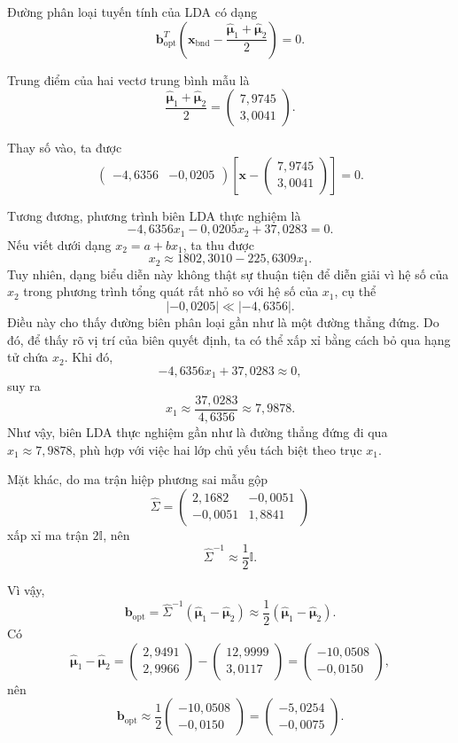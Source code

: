 Đường phân loại tuyến tính của LDA có dạng
\[
\bm{b}_{\text{opt}}^T
\left(
\bm{x}_{\text{bnd}}
-
\frac{\hat{\bm{\mu}}_1+\hat{\bm{\mu}}_2}{2}
\right)
=0.
\]

Trung điểm của hai vectơ trung bình mẫu là
\[
\frac{\hat{\bm{\mu}}_1+\hat{\bm{\mu}}_2}{2}
=
\begin{pmatrix}
	7{,}9745\\
	3{,}0041
\end{pmatrix}.
\]

Thay số vào, ta được
\[
\begin{pmatrix}
	-4{,}6356 & -0{,}0205
\end{pmatrix}
\left[
\bm{x}
-
\begin{pmatrix}
	7{,}9745\\
	3{,}0041
\end{pmatrix}
\right]
=0.
\]

Tương đương, phương trình biên LDA thực nghiệm là \[ -4{,}6356x_1 - 0{,}0205x_2 + 37{,}0283 = 0. \] Nếu viết dưới dạng \(x_2=a+bx_1\), ta thu được \[ x_2 \approx 1802{,}3010 - 225{,}6309x_1. \] Tuy nhiên, dạng biểu diễn này không thật sự thuận tiện để diễn giải vì hệ số của \(x_2\) trong phương trình tổng quát rất nhỏ so với hệ số của \(x_1\), cụ thể \[ |-0{,}0205| \ll |-4{,}6356|. \] Điều này cho thấy đường biên phân loại gần như là một đường thẳng đứng. Do đó, để thấy rõ vị trí của biên quyết định, ta có thể xấp xỉ bằng cách bỏ qua hạng tử chứa \(x_2\). Khi đó, \[ -4{,}6356x_1+37{,}0283 \approx 0, \] suy ra \[ x_1 \approx \frac{37{,}0283}{4{,}6356} \approx 7{,}9878. \] Như vậy, biên LDA thực nghiệm gần như là đường thẳng đứng đi qua \(x_1 \approx 7{,}9878\), phù hợp với việc hai lớp chủ yếu tách biệt theo trục \(x_1\).

Mặt khác, do ma trận hiệp phương sai mẫu gộp
\[
\hat{\Sigma}
=
\begin{pmatrix}
	2{,}1682 & -0{,}0051\\
	-0{,}0051 & 1{,}8841
\end{pmatrix}
\]
xấp xỉ ma trận $2\mathbb{I}$, nên
\[
\hat{\Sigma}^{-1}
\approx
\frac{1}{2}\mathbb{I}.
\]

Vì vậy,
\[
\bm{b}_{\text{opt}}
=
\hat{\Sigma}^{-1}
(\hat{\bm{\mu}}_1-\hat{\bm{\mu}}_2)
\approx
\frac{1}{2}
(\hat{\bm{\mu}}_1-\hat{\bm{\mu}}_2).
\]
Có
\[
\hat{\bm{\mu}}_1-\hat{\bm{\mu}}_2
=
\begin{pmatrix}
	2{,}9491\\
	2{,}9966
\end{pmatrix}
-
\begin{pmatrix}
	12{,}9999\\
	3{,}0117
\end{pmatrix}
=
\begin{pmatrix}
	-10{,}0508\\
	-0{,}0150
\end{pmatrix},
\]
nên
\[
\bm{b}_{\text{opt}}
\approx
\frac{1}{2}
\begin{pmatrix}
	-10{,}0508\\
	-0{,}0150
\end{pmatrix}
=
\begin{pmatrix}
	-5{,}0254\\
	-0{,}0075
\end{pmatrix}.
\]

